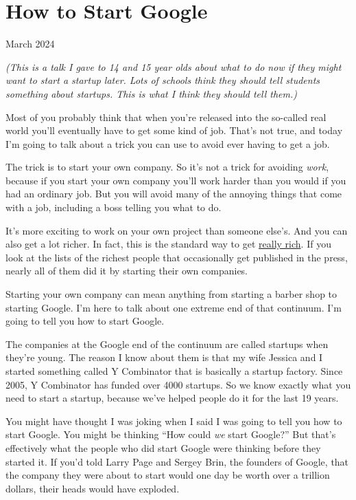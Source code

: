 \chapter{How to Start Google}

March 2024

\emph{(This is a talk I gave to 14 and 15 year olds about what to do now
if they might want to start a startup later. Lots of schools think they
should tell students something about startups. This is what I think they
should tell them.)}

Most of you probably think that when you're released into the so-called
real world you'll eventually have to get some kind of job. That's not
true, and today I'm going to talk about a trick you can use to avoid
ever having to get a job.

The trick is to start your own company. So it's not a trick for avoiding
\emph{work}, because if you start your own company you'll work harder
than you would if you had an ordinary job. But you will avoid many of
the annoying things that come with a job, including a boss telling you
what to do.

It's more exciting to work on your own project than someone else's. And
you can also get a lot richer. In fact, this is the standard way to get
\href{richnow.html}{really rich}. If you look at the lists of the
richest people that occasionally get published in the press, nearly all
of them did it by starting their own companies.

Starting your own company can mean anything from starting a barber shop
to starting Google. I'm here to talk about one extreme end of that
continuum. I'm going to tell you how to start Google.

The companies at the Google end of the continuum are called startups
when they're young. The reason I know about them is that my wife Jessica
and I started something called Y Combinator that is basically a startup
factory. Since 2005, Y Combinator has funded over 4000 startups. So we
know exactly what you need to start a startup, because we've helped
people do it for the last 19 years.

You might have thought I was joking when I said I was going to tell you
how to start Google. You might be thinking ``How could \emph{we} start
Google?'' But that's effectively what the people who did start Google
were thinking before they started it. If you'd told Larry Page and
Sergey Brin, the founders of Google, that the company they were about to
start would one day be worth over a trillion dollars, their heads would
have exploded.

